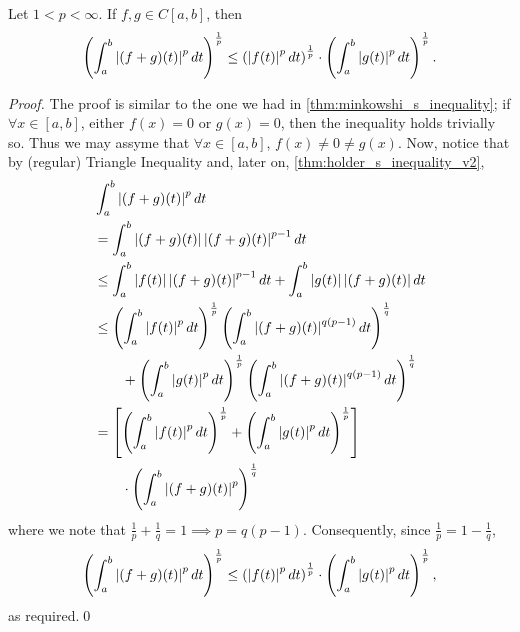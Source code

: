 \documentclass[notoc,notitlepage]{tufte-book}
\begin{document}
\begin{thm}
\label{thm:minkowski_s_inequality_v2}
  Let $1 < p < \infty$. If $f, g \in C[a, b]$, then
  \begin{equation*}
    \left( \int_{a}^{b} \left|(f + g)(t)\right|^p \mathop{}\!d{t} \right)^\frac{1}{p} \leq \left( \left|f(t)\right|^p \mathop{}\!d{t} \right)^\frac{1}{p} \cdot \left( \int_{a}^{b} \left|g(t)\right|^p \mathop{}\!d{t} \right)^\frac{1}{p}.
  \end{equation*}
\end{thm}

\begin{proof}
  The proof is similar to the one we had in \cref{thm:minkowshi_s_inequality}; if $\forall x \in [a, b]$, either $f(x) = 0$ or $g(x) = 0$, then the inequality holds trivially so. Thus we may assyme that $\forall x \in [a, b]$, $f(x) \neq 0 \neq g(x)$. Now, notice that by (regular) Triangle Inequality and, later on, \cref{thm:holder_s_inequality_v2},
  \begin{align*}
    &\int_{a}^{b} \abs{(f + g)(t)}^p \dif{t} \\
    &= \int_{a}^{b} \abs{(f + g)(t)} \abs{(f + g)(t)}^{p - 1} \dif{t} \\
    &\leq \int_{a}^{b} \abs{f(t)} \abs{(f + g)(t)}^{p - 1} \dif{t} + \int_{a}^{b} \abs{g(t)} \abs{(f + g)(t)} \dif{t} \\
    &\leq \left( \int_{a}^{b} \abs{f(t)}^p \dif{t} \right)^\frac{1}{p} \left( \int_{a}^{b} \abs{(f + g)(t)}^{q (p - 1)} \dif{t} \right)^\frac{1}{q} \\
    &\qquad + \left( \int_{a}^{b} \abs{g(t)}^p \dif{t} \right)^\frac{1}{p} \left( \int_{a}^{b} \abs{(f + g)(t)}^{q (p - 1)} \dif{t} \right)^\frac{1}{q} \\
    &= \left[ \left( \int_{a}^{b} \abs{f(t)}^p \dif{t} \right)^\frac{1}{p} + \left( \int_{a}^{b} \abs{g(t)}^p \dif{t} \right)^\frac{1}{p} \right] \\
    &\qquad \cdot \left( \int_{a}^{b} \abs{(f + g)(t)}^{p} \right)^\frac{1}{q}
  \end{align*}
  where we note that $\frac{1}{p} + \frac{1}{q} = 1 \implies p = q(p - 1)$. Consequently, since $\frac{1}{p} = 1 - \frac{1}{q}$,
  \begin{equation*}
    \left( \int_{a}^{b} \left|(f + g)(t)\right|^p \mathop{}\!d{t} \right)^\frac{1}{p} \leq \left( \left|f(t)\right|^p \mathop{}\!d{t} \right)^\frac{1}{p} \cdot \left( \int_{a}^{b} \left|g(t)\right|^p \mathop{}\!d{t} \right)^\frac{1}{p},
  \end{equation*}
  as required.\qed
\end{proof}
\end{document}
